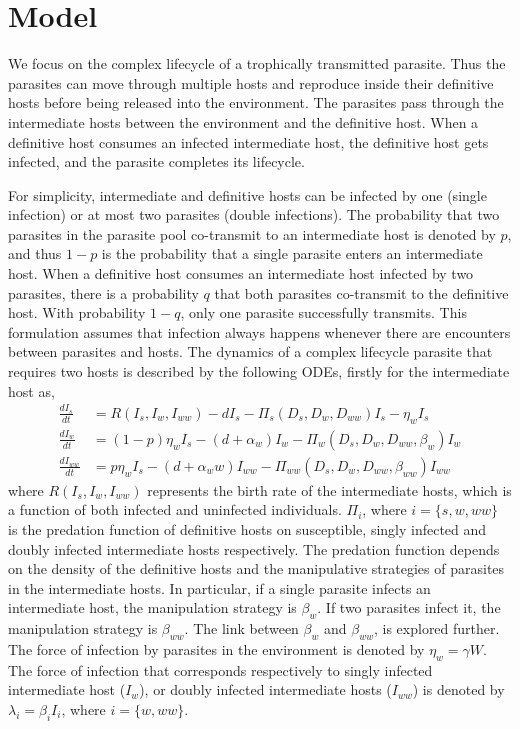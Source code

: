 \documentclass{article}
\begin{document}
\section{Model}
We focus on the complex lifecycle of a trophically transmitted parasite. 
Thus the parasites can move through multiple hosts and reproduce inside their definitive hosts before being released into the environment. 
The parasites pass through the intermediate hosts between the environment and the definitive host.
When a definitive host consumes an infected intermediate host, the definitive host gets infected, and the parasite completes its lifecycle.

For simplicity, intermediate and definitive hosts can be infected by one (single infection) or at most two parasites (double infections). 
The probability that two parasites in the parasite pool co-transmit to an intermediate host is denoted by  $p$, and thus $1-p$ is the probability that a single parasite enters an intermediate host. 
When a definitive host consumes an intermediate host infected by two parasites, there is a probability $q$ that both parasites co-transmit to the definitive host.
With probability $1-q$, only one parasite successfully transmits. 
This formulation assumes that infection always happens whenever there are encounters between parasites and hosts.
The dynamics of a complex lifecycle parasite that requires two hosts is described by the following ODEs, firstly for the intermediate host as,
%
\begin{align}
\frac{dI_s}{dt} &= R(I_s, I_w, I_{ww}) - d I_s - \Pi_s(D_s, D_w, D_{ww}) I_s  - \eta_w  I_s \nonumber \\ 
\frac{dI_w}{dt} &=  (1 - p) \eta_w I_s  - (d + \alpha_w) I_w - \Pi_w(D_s, D_w, D_{ww}, \beta_w) I_w \label{odes:ihosts} \\
\frac{dI_{ww}}{dt} &= p \eta_w I_s  - (d + \alpha_ww) I_{ww} - \Pi_{ww}(D_s, D_w, D_{ww}, \beta_{ww}) I_{ww} \nonumber
\end{align}
%
where $R(I_s, I_w, I_{ww})$ represents the birth rate of the intermediate hosts, which is a function of both infected and uninfected individuals. 
$\Pi_i$, where $i = \{s, w, ww\}$ is the predation function of definitive hosts on susceptible, singly infected and doubly infected intermediate hosts respectively. 
The predation function depends on the density of the definitive hosts and the manipulative strategies of parasites in the intermediate hosts. 
In particular, if a single parasite infects an intermediate host, the manipulation strategy is $\beta_w$. 
If two parasites infect it, the manipulation strategy is $\beta_{ww}$. 
The link between $\beta_w$ and $\beta_{ww}$, is explored further. 
The force of infection by parasites in the environment is denoted by $\eta_w = \gamma W$. 
The force of infection that corresponds respectively to singly infected intermediate host ($I_w$), or doubly infected intermediate hosts ($I_{ww}$) is denoted by $\lambda_i = \beta_i I_i$, where $i = \{ w, ww\}$. 
\end{document}
